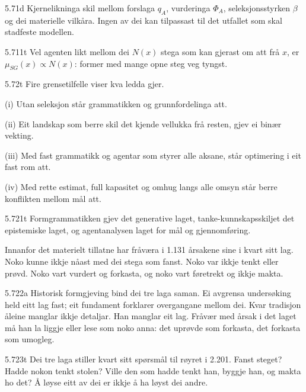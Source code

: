 \begin{formproposition}{5.71}{d}
Kjernelikninga skil mellom forslaga \(q_A\), vurderinga \(\Phi_A\), seleksjonsstyrken \(\beta\) og dei materielle vilkåra. Ingen av dei kan tilpassast til det utfallet som skal stadfeste modellen.
\end{formproposition}

\begin{formproposition}{5.711}{t}
Vel agenten likt mellom dei \(N(x)\) stega som kan gjerast om att frå \(x\), er \(\mu_{SG}(x)\propto N(x)\): former med mange opne steg veg tyngst.
\end{formproposition}

\begin{formproposition}{5.72}{t}
Fire grensetilfelle viser kva ledda gjer.

(i) Utan seleksjon står grammatikken og grunnfordelinga att.

(ii) Eit landskap som berre skil det kjende vellukka frå resten, gjev ei binær vekting.

(iii) Med fast grammatikk og agentar som styrer alle aksane, står optimering i eit fast rom att.

(iv) Med rette estimat, full kapasitet og omhug langs alle omsyn står berre konflikten mellom mål att.
\end{formproposition}

\begin{formproposition}{5.721}{t}
Formgrammatikken gjev det generative laget, tanke-kunnskapsskiljet det epistemiske laget, og agentanalysen laget for mål og gjennomføring.

Innanfor det materielt tillatne har fråværa i 1.131 årsakene sine i kvart sitt lag. Noko kunne ikkje nåast med dei stega som fanst. Noko var ikkje tenkt eller prøvd. Noko vart vurdert og forkasta, og noko vart føretrekt og ikkje makta.
\end{formproposition}

\begin{formproposition}{5.722}{a}
Historisk formgjeving bind dei tre laga saman. Ei avgrensa undersøking held eitt lag fast; eit fundament forklarer overgangane mellom dei. Kvar tradisjon åleine manglar ikkje detaljar. Han manglar eit lag. Fråvær med årsak i det laget må han la liggje eller lese som noko anna: det uprøvde som forkasta, det forkasta som umogleg.
\end{formproposition}

\begin{formproposition}{5.723}{t}
Dei tre laga stiller kvart sitt spørsmål til røyret i 2.201. Fanst steget? Hadde nokon tenkt stolen? Ville den som hadde tenkt han, byggje han, og makta ho det? Å løyse eitt av dei er ikkje å ha løyst dei andre.
\end{formproposition}

